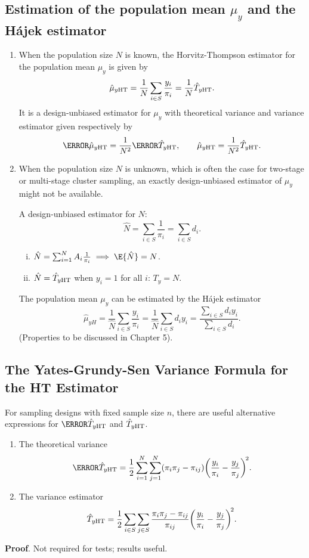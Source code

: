 \subsection{Estimation of the population mean \texorpdfstring{$\mu_y$}{μy} and the Hájek estimator}
\begin{enumerate}[(1)]
      \item When the population size $N$ is known, the Horvitz-Thompson
            estimator for the population mean $ \mu_y $ is given by
            \[ \hat{\mu}_{y\text{HT}}=\frac{1}{N}\sum_{i\in S}\frac{y_i}{\pi_i}=\frac{1}{N}\hat{T}_{y\text{HT}}. \]
            It is a design-unbiased estimator for $ \mu_y $ with theoretical variance and
            variance estimator given respectively by
            \[ \V{\hat{\mu}_{y\HT}}=\frac{1}{N^2}\V{\hat{T}_{y\HT}},\qquad \v{\hat{\mu}_{y\HT}}=\frac{1}{N^2}\v{\hat{T}_{y\HT}}. \]
      \item When the population size $N$ is unknown, which is often the case
            for two-stage or multi-stage cluster sampling, an exactly
            design-unbiased estimator of $ \mu_y $ might not be available.

            A design-unbiased estimator for $N$:
            \[ \hat{N}=\sum_{i\in S}\frac{1}{\pi_i}=\sum_{i\in S}d_i. \]
            \begin{enumerate}[(i)]
                  \item $ \hat{N}=\sum_{i=1}^{N}A_i \frac{1}{\pi_i}\implies \E{\hat{N}}=N $.
                  \item $ \hat{N}=\hat{T}_{y\text{HT}} $ when $ y_i=1 $ for all $ i $: $ T_y=N $.
            \end{enumerate}
            The population mean $ \mu_y $ can be estimated by the Hájek estimator
            \[ \hat{\mu}_{yH}=\frac{1}{\hat{N}}\sum_{i\in S}\frac{y_i}{\pi_i}=\frac{1}{\hat{N}}\sum_{i\in S}d_i y_i=\frac{\sum_{i\in S}d_i y_i}{\sum_{i\in S}d_i}. \]
            (Properties to be discussed in Chapter 5).
\end{enumerate}

\subsection{The Yates-Grundy-Sen Variance Formula for the HT Estimator}
For sampling designs with fixed sample size $n$, there are useful
alternative expressions for $ \V{\hat{T}_{y\HT}} $ and $ \relax{\hat{T}_{y\text{HT}}} $.
\begin{enumerate}[(1)]
      \item The theoretical variance
            \[ \V{\hat{T}_{y\HT}}=\frac{1}{2}\sum_{i=1}^{N}\sum_{j=1}^{N}(\pi_i\pi_j-\pi_{ij})\biggl(\frac{y_i}{\pi_i}-\frac{y_j}{\pi_j}\biggr)^{\!2}. \]
      \item The variance estimator
            \[ \relax{\hat{T}_{y\text{HT}}}=\frac{1}{2}\sum_{i\in S}\sum_{j\in S}\frac{\pi_i\pi_j-\pi_{ij}}{\pi_{ij}}\biggl(\frac{y_i}{\pi_i}-\frac{y_j}{\pi_j}\biggr)^{\!2}. \]
\end{enumerate}
\textbf{Proof}. Not required for tests; results useful.

